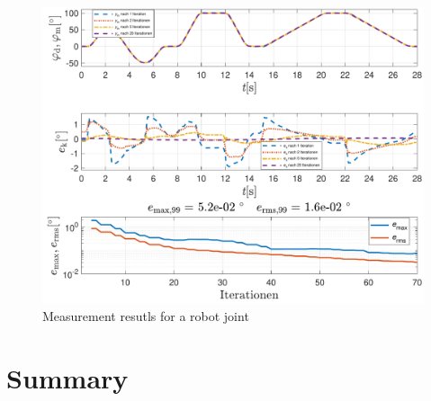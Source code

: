 \documentclass[conference]{IEEEtran}
\begin{document}
\begin{figure}[htbp]
\centerline{\includegraphics[scale=.7]{./pictures/dSpace_Messung_ILC_DR70_Shruti.pdf}}
\caption{Measurement resutls for a robot joint}
\label{fig:ILC70Shruti}
\end{figure}

\section{Summary}




\end{document}
